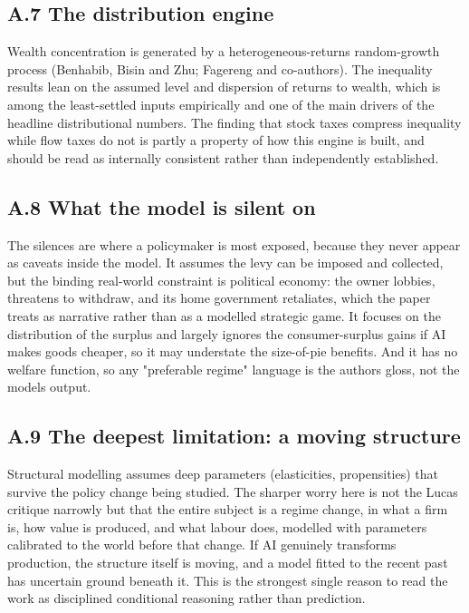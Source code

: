 \documentclass[12pt]{article}
\begin{document}
\hypertarget{a.7-the-distribution-engine}{%
\subsection{A.7 The distribution
engine}\label{a.7-the-distribution-engine}}

Wealth concentration is generated by a heterogeneous-returns
random-growth process (Benhabib, Bisin and Zhu; Fagereng and
co-authors). The inequality results lean on the assumed level and
dispersion of returns to wealth, which is among the least-settled inputs
empirically and one of the main drivers of the headline distributional
numbers. The finding that stock taxes compress inequality while flow
taxes do not is partly a property of how this engine is built, and
should be read as internally consistent rather than independently
established.

\hypertarget{a.8-what-the-model-is-silent-on}{%
\subsection{A.8 What the model is silent
on}\label{a.8-what-the-model-is-silent-on}}

The silences are where a policymaker is most exposed, because they never
appear as caveats inside the model. It assumes the levy can be imposed
and collected, but the binding real-world constraint is political
economy: the owner lobbies, threatens to withdraw, and its home
government retaliates, which the paper treats as narrative rather than
as a modelled strategic game. It focuses on the distribution of the
surplus and largely ignores the consumer-surplus gains if AI makes goods
cheaper, so it may understate the size-of-pie benefits. And it has no
welfare function, so any "preferable regime" language is the
authors\textquotesingle{} gloss, not the model\textquotesingle s output.

\hypertarget{a.9-the-deepest-limitation-a-moving-structure}{%
\subsection{A.9 The deepest limitation: a moving
structure}\label{a.9-the-deepest-limitation-a-moving-structure}}

Structural modelling assumes deep parameters (elasticities,
propensities) that survive the policy change being studied. The sharper
worry here is not the Lucas critique narrowly but that the entire
subject is a regime change, in what a firm is, how value is produced,
and what labour does, modelled with parameters calibrated to the world
before that change. If AI genuinely transforms production, the structure
itself is moving, and a model fitted to the recent past has uncertain
ground beneath it. This is the strongest single reason to read the work
as disciplined conditional reasoning rather than prediction.
\end{document}
